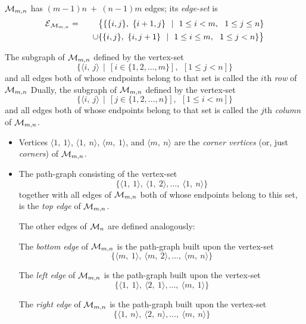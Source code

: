 $\mbox{$\cal M$}_{m,n}$ has $(m-1)n \ + \ (n-1)m$ edges; its {\it edge-set} is
\begin{eqnarray*}
\mbox{$\cal E$}_{\mbox{{\scriptsize $\cal M$}}_{m,n}} & = & 
\big\{
\{ \{ i, j \}, \ \{ i+1, j \} \ \ | \ \
1 \leq i < m, \ \ 1 \leq j \leq n \} \\
  &  & \hspace*{.1in} \cup
\{ \{ i, j \}, \ \{ i, j+1 \} \ \ | \ \
1 \leq i \leq m, \ \ 1 \leq j < n \}
\big\}
\end{eqnarray*}

\medskip

The subgraph of $\mbox{$\cal M$}_{m,n}$ defined by the vertex-set
\[ \{ \langle i, \ j \rangle  \ \ | \ \ \left[i \in \{1, 2, \ldots,
  m\}\right], \ \ \left[1 \leq j < n\right]\}
\]
and all edges both of whose endpoints belong to that set is called the
$i$th {\it row} of $\mbox{$\cal M$}_{m,n}$
Dually, the subgraph of $\mbox{$\cal M$}_{m,n}$ defined by the vertex-set
\[ \{ \langle i, \ j \rangle  \ \ | \ \ \left[j \in \{1, 2, \ldots,
  n\}\right], \ \ \left[1 \leq i < m\right] \}
\]
and all edges both of whose endpoints belong to that set is called the
$j$th {\it column} of $\mbox{$\cal M$}_{m,n}$.


\begin{itemize}
     \item
Vertices $\langle 1, \ 1 \rangle$, $\langle 1, \ n \rangle$, $\langle m,
\ 1 \rangle$, and $\langle m, \ n \rangle$ are the {\it corner vertices}
(or, just {\it corners}) of $\mbox{$\cal M$}_{m,n}$.
     \item
The path-graph consisting of the vertex-set
\[ \{ \langle 1, \ 1 \rangle, \ \langle 1, \ 2 \rangle, \ldots, \
\langle 1, \ n \rangle \}
\]
together with all edges of $\mbox{$\cal M$}_{m,n}$ both of whose endpoints belong
to this set, is the {\it top edge} of $\mbox{$\cal M$}_{m,n}$.

The other edges of $\mbox{$\cal M$}_n$ are defined analogously:

\medskip

The {\it bottom edge} of $\mbox{$\cal M$}_{m,n}$ is the path-graph built upon the
vertex-set
\[ \{ \langle m, \ 1 \rangle, \ \langle m, \ 2 \rangle, \ldots, \
\langle m, \ n \rangle \}
\]

The {\it left edge} of $\mbox{$\cal M$}_{m,n}$ is the path-graph built upon the
vertex-set
\[ \{ \langle 1, \ 1 \rangle, \ \langle 2, \ 1 \rangle, \ldots, \
\langle m, \ 1 \rangle \}
\]

The {\it right edge} of $\mbox{$\cal M$}_{m,n}$ is the path-graph built upon the
vertex-set
\[ \{ \langle 1, \ n \rangle, \ \langle 2, \ n \rangle, \ldots, \
\langle m, \ n \rangle \}
\]
\end{itemize}
\medskip

